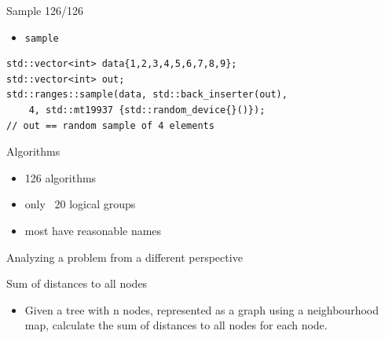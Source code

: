 \documentclass[aspectratio=169]{beamer}
\begin{document}
\begin{frame}{Sample 126/126}
  \begin{itemize}
    \item{\texttt{sample}}
  \end{itemize}
\end{frame}

\begin{frame}[fragile]{}
  \begin{verbatim}
std::vector<int> data{1,2,3,4,5,6,7,8,9};
std::vector<int> out;
std::ranges::sample(data, std::back_inserter(out),
    4, std::mt19937 {std::random_device{}()});
// out == random sample of 4 elements
  \end{verbatim}
\end{frame}

\begin{frame}{Algorithms}
  \begin{itemize}
    \item 126 algorithms
    \item only ~20 logical groups
    \item most have reasonable names
  \end{itemize}
\end{frame}


\begin{frame}[c]
  \begin{center}
    \huge Analyzing a problem from a different perspective
  \end{center}
\end{frame}

\begin{frame}{Sum of distances to all nodes}
  \begin{itemize}
    \item Given a tree with n nodes, represented as a graph using a neighbourhood map, calculate the sum of distances to all nodes for each node.
  \end{itemize}
\end{frame}

\begin{frame}{}
\end{frame}
\end{document}
